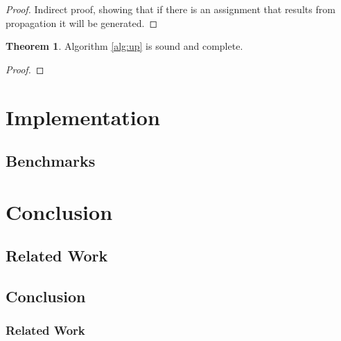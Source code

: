 \documentclass{vutinfth} %
\theoremstyle{example}
\theoremstyle{definition}
\theoremstyle{theorem}
\newtheorem{theorem}{Theorem}[section]
\theoremstyle{lemma}
\theoremstyle{corollary}
\begin{document}
\begin{proof}
Indirect proof, showing that if there is an assignment that results from propagation it will be generated.
\end{proof}

\begin{theorem}
Algorithm \ref{alg:up} is sound and complete.
\end{theorem}

\begin{proof}

\end{proof}

\chapter{Implementation}

\section{Benchmarks}

\chapter{Conclusion}

\section{Related Work}

\section{Conclusion}

\subsection{Related Work}

\backmatter

\listoffigures %

\listoftables %

\listofalgorithms
{}

\printindex

\printglossaries



\end{document}
